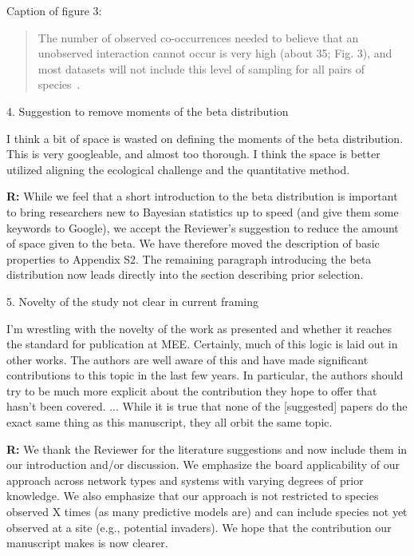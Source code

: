 \documentclass[12pt]{letter}
\newenvironment{refquote}{\bigskip \begin{it}}{\end{it}\smallskip}
\begin{document}
		Caption of figure 3:

		\begin{quotation}
			The number of observed co-occurrences needed to believe that an unobserved interaction cannot occur is very high (about 35; Fig. 3), and most datasets will not include this level of sampling for all pairs of species~\citep{Bartomeus2013}.
		\end{quotation}


	4. Suggestion to remove moments of the beta distribution

		\begin{refquote}
		I think a bit of space is wasted on defining the moments of the beta distribution. This is very googleable, and almost too thorough. I think the space is better utilized aligning the ecological challenge and the quantitative method.
		\end{refquote}

		\textbf{R:} While we feel that a short introduction to the beta distribution is important to bring researchers new to Bayesian statistics up to speed (and give them some keywords to Google), we accept the Reviewer's suggestion to reduce the amount of space given to the beta. We have therefore moved the description of basic properties to Appendix S2. The remaining paragraph introducing the beta distribution now leads directly into the section describing prior selection.


	5. Novelty of the study not clear in current framing

		\begin{refquote}
		I’m wrestling with the novelty of the work as presented and whether it reaches the standard for publication at MEE. Certainly, much of this logic is laid out in other works. The authors are well aware of this and have made significant contributions to this topic in the last few years. In particular, the authors should try to be much more explicit about the contribution they hope to offer that hasn’t been covered. ...
		While it is true that none of the [suggested] papers do the exact same thing as this manuscript, they all	orbit the same topic. 
		\end{refquote}


		\textbf{R:} We thank the Reviewer for the literature suggestions and now include them in our introduction and/or discussion. We emphasize the board applicability of our approach across network types and systems with varying degrees of prior knowledge. We also emphasize that our approach is not restricted to species observed X times (as many predictive models are) and can include species not yet observed at a site (e.g., potential invaders). We hope that the contribution our manuscript makes is now clearer.
\end{document}
